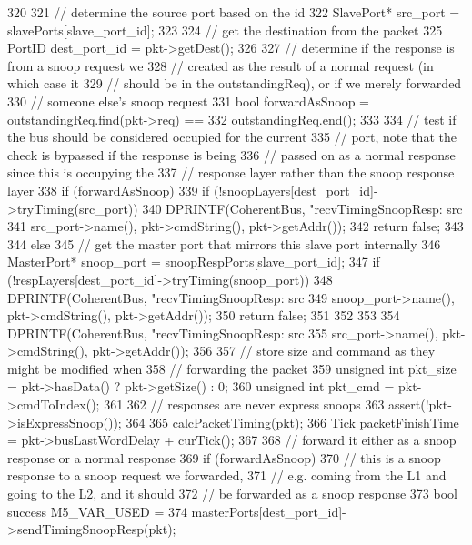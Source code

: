 \begin{DoxyCode}
320 {
321     // determine the source port based on the id
322     SlavePort* src_port = slavePorts[slave_port_id];
323 
324     // get the destination from the packet
325     PortID dest_port_id = pkt->getDest();
326 
327     // determine if the response is from a snoop request we
328     // created as the result of a normal request (in which case it
329     // should be in the outstandingReq), or if we merely forwarded
330     // someone else's snoop request
331     bool forwardAsSnoop = outstandingReq.find(pkt->req) ==
332         outstandingReq.end();
333 
334     // test if the bus should be considered occupied for the current
335     // port, note that the check is bypassed if the response is being
336     // passed on as a normal response since this is occupying the
337     // response layer rather than the snoop response layer
338     if (forwardAsSnoop) {
339         if (!snoopLayers[dest_port_id]->tryTiming(src_port)) {
340             DPRINTF(CoherentBus, "recvTimingSnoopResp: src %
341                     src_port->name(), pkt->cmdString(), pkt->getAddr());
342             return false;
343         }
344     } else {
345         // get the master port that mirrors this slave port internally
346         MasterPort* snoop_port = snoopRespPorts[slave_port_id];
347         if (!respLayers[dest_port_id]->tryTiming(snoop_port)) {
348             DPRINTF(CoherentBus, "recvTimingSnoopResp: src %
349                     snoop_port->name(), pkt->cmdString(), pkt->getAddr());
350             return false;
351         }
352     }
353 
354     DPRINTF(CoherentBus, "recvTimingSnoopResp: src %
355             src_port->name(), pkt->cmdString(), pkt->getAddr());
356 
357     // store size and command as they might be modified when
358     // forwarding the packet
359     unsigned int pkt_size = pkt->hasData() ? pkt->getSize() : 0;
360     unsigned int pkt_cmd = pkt->cmdToIndex();
361 
362     // responses are never express snoops
363     assert(!pkt->isExpressSnoop());
364 
365     calcPacketTiming(pkt);
366     Tick packetFinishTime = pkt->busLastWordDelay + curTick();
367 
368     // forward it either as a snoop response or a normal response
369     if (forwardAsSnoop) {
370         // this is a snoop response to a snoop request we forwarded,
371         // e.g. coming from the L1 and going to the L2, and it should
372         // be forwarded as a snoop response
373         bool success M5_VAR_USED =
374             masterPorts[dest_port_id]->sendTimingSnoopResp(pkt);
}}
\end{DoxyCode}
